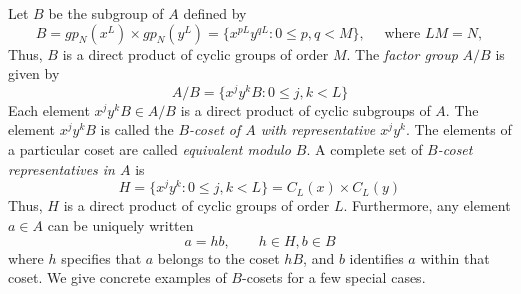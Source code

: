 Let $B$ be the subgroup of $A$ defined by
\[
B = gp_N(x^L) \times gp_N(y^L) = \{x^{pL} y^{qL} : 0 \leq p,q < M \}, \quad \text{ where } LM = N,
\]
Thus, $B$ is a direct product of cyclic groups of order $M$.
The \emph{factor group} $A/B$ is given by
\[
A/B = \{x^j y^k B : 0 \leq j,k < L \}
\]
Each element $x^j y^k B \in A/B$ is a direct product of cyclic subgroups of $A$.
The element $x^j y^k B$ is called the \emph{$B$-coset of $A$ with representative
$x^j y^k$}.  The elements of a particular coset are called \emph{equivalent modulo $B$}.
A complete set of \emph{$B$-coset representatives in $A$}  is 
\[
H = \{x^j y^k : 0 \leq j,k < L \} = C_L(x) \times C_L(y)
\]
Thus, $H$ is a direct product of cyclic groups of order $L$.
Furthermore, any element $a\in A$ can be uniquely written
\[
a = hb, \qquad h\in H, b\in B
\]
where $h$ specifies that $a$ belongs to the coset $hB$, and $b$ identifies $a$
within that coset. 
We give concrete examples of $B$-cosets for a few special cases.  
